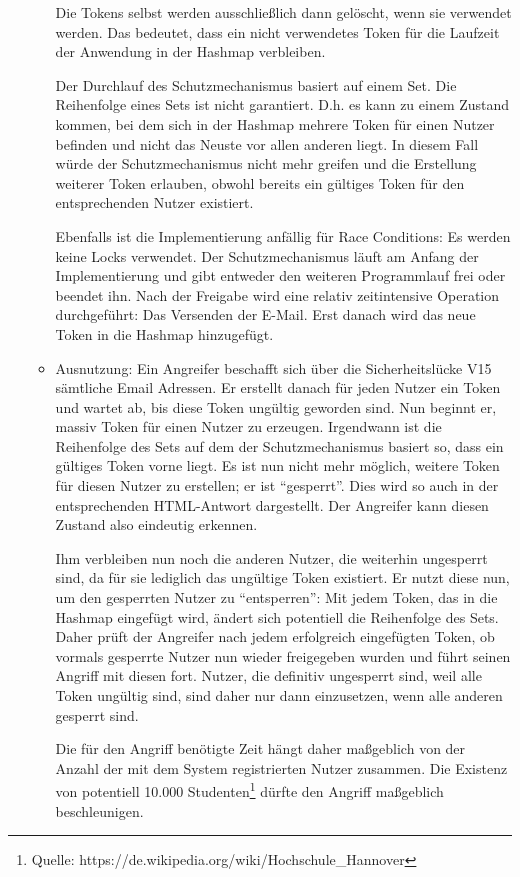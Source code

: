 \documentclass[12pt,DIV14,BCOR10mm,a4paper,parskip=half-,headsepline,headinclude,english,ngerman,bibliography=totocnumbered]{scrreprt}
\begin{document}
\begin{itemize}
\begin{itemize}
  Die Tokens selbst werden ausschließlich dann gelöscht, wenn sie verwendet werden. Das bedeutet, dass ein nicht verwendetes Token für die Laufzeit der Anwendung in der Hashmap verbleiben.

  Der Durchlauf des Schutzmechanismus basiert auf einem Set. Die Reihenfolge eines Sets ist nicht garantiert. D.h. es kann zu einem Zustand kommen, bei dem sich in der Hashmap mehrere Token für einen Nutzer befinden und nicht das Neuste vor allen anderen liegt. In diesem Fall würde der Schutzmechanismus nicht mehr greifen und die Erstellung weiterer Token erlauben, obwohl bereits ein gültiges Token für den entsprechenden Nutzer existiert.

  Ebenfalls ist die Implementierung anfällig für Race Conditions: Es werden keine Locks verwendet. Der Schutzmechanismus läuft am Anfang der Implementierung und gibt entweder den weiteren Programmlauf frei oder beendet ihn. Nach der Freigabe wird eine relativ zeitintensive Operation durchgeführt: Das Versenden der E-Mail. Erst danach wird das neue Token in die Hashmap hinzugefügt.
  \item Ausnutzung: Ein Angreifer beschafft sich über die Sicherheitslücke V15 sämt\-liche Email Adressen. Er erstellt danach für jeden Nutzer ein Token und wartet ab, bis diese Token ungültig geworden sind. Nun beginnt er, massiv Token für einen Nutzer zu erzeugen. Irgendwann ist die Reihenfolge des Sets auf dem der Schutzmechanismus basiert so, dass ein gültiges Token vorne liegt. Es ist nun nicht mehr möglich, weitere Token für diesen Nutzer zu erstellen; er ist \enquote{gesperrt}. Dies wird so auch in der entsprechenden HTML-Antwort dargestellt. Der Angreifer kann diesen Zustand also eindeutig erkennen.

  Ihm verbleiben nun noch die anderen Nutzer, die weiterhin ungesperrt sind, da für sie lediglich das ungültige Token existiert. Er nutzt diese nun, um den gesperrten Nutzer zu \enquote{entsperren}: Mit jedem Token, das in die Hashmap eingefügt wird, ändert sich potentiell die Reihenfolge des Sets. Daher prüft der Angreifer nach jedem erfolgreich eingefügten Token, ob vormals gesperrte Nutzer nun wieder freigegeben wurden und führt seinen Angriff mit diesen fort. Nutzer, die definitiv ungesperrt sind, weil alle Token ungültig sind, sind daher nur dann einzusetzen, wenn alle anderen gesperrt sind.

  Die für den Angriff benötigte Zeit hängt daher maßgeblich von der Anzahl der mit dem System registrierten Nutzer zusammen. Die Existenz von potentiell 10.000 Studenten\footnote{Quelle: https://de.wikipedia.org/wiki/Hochschule\_Hannover} dürfte den Angriff maßgeblich beschleunigen.


\end{itemize}
\end{itemize}
\end{document}
